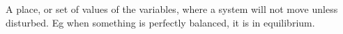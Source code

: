 A place, or set of values of the variables, where a system will
not move unless disturbed. Eg when something is perfectly balanced,
it is in equilibrium.